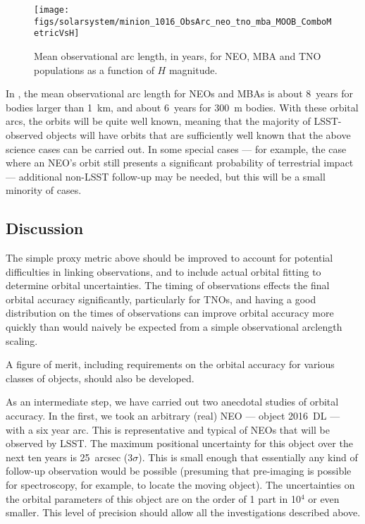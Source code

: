 \begin{figure}
\texttt{[image: figs/solarsystem/minion\_1016\_ObsArc\_neo\_tno\_mba\_MOOB\_ComboMetricVsH]}
\caption{Mean observational arc length, in years, for NEO, MBA and TNO
  populations as a function of $H$ magnitude.
\label{obsarc}}
\end{figure}

In , the mean observational arc length for
NEOs and MBAs is about 8~years for bodies larger than 1~km, and about
6~years for 300~m bodies. With these
orbital arcs, the orbits will be quite well known,
meaning that the majority
of LSST-observed objects will have orbits that are sufficiently
well known that the above science cases can be carried out.
In some special cases --- for example, the case where
an NEO's orbit still presents a significant probability
of terrestrial impact --- additional non-LSST follow-up
may be needed, but this will be a small minority of cases.



\subsection{Discussion}
\label{sec:\secname:discussion}

The simple proxy metric above should be improved to account for
potential difficulties in linking observations, and to include actual
orbital fitting to determine orbital uncertainties. The timing of
observations effects the final orbital accuracy significantly,
particularly for TNOs, and having a good distribution on the times of
observations can improve orbital accuracy more quickly than would
naively be expected from a simple observational arclength scaling.

A figure of merit, including requirements on the orbital accuracy for
various classes of objects, should also be developed.

As an intermediate step, we have carried out two anecdotal studies
of orbital accuracy. In the first,
we took an arbitrary (real) NEO --- object 2016~DL ---
with a six year arc. This is representative
and typical of NEOs that will be observed
by LSST.
The maximum positional uncertainty for this object
over the next ten years
is 25~arcsec (3$\sigma$). This is small enough
that essentially any kind of follow-up observation would be
possible (presuming that pre-imaging is possible
for spectroscopy, for example, to locate the moving
object).
The uncertainties on the orbital parameters
of this object are on the order of
1 part in 10$^4$ or even smaller. This level of
precision should allow all the investigations described
above.

